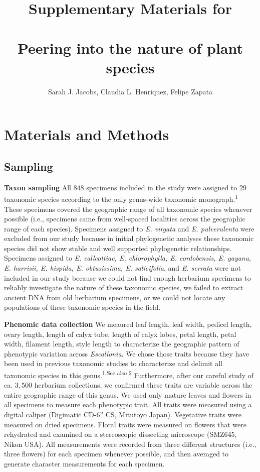 \documentclass[
  11pt,
]{article}
\title{Supplementary Materials for\\
~\\
\textbf{Peering into the nature of plant species}}
\author{Sarah J. Jacobs, Claudia L. Henriquez, Felipe Zapata}
\date{}
\begin{document}
\maketitle

{
\hypersetup{linkcolor=}
\setcounter{tocdepth}{4}
\tableofcontents
}
\hypertarget{materials-and-methods}{%
\section{Materials and Methods}\label{materials-and-methods}}

\hypertarget{sampling}{%
\subsection{Sampling}\label{sampling}}

\textbf{Taxon sampling} All \(848\) specimens included in the study were assigned to \(29\) taxonomic species according to the only genus-wide taxonomic monograph.\textsuperscript{1} These specimens covered the geographic range of all taxonomic species whenever possible (i.e., specimens came from well-spaced localities across the geographic range of each species). Specimens assigned to \emph{E. virgata} and \emph{E. pulverulenta} were excluded from our study because in initial phylogenetic analyses these taxonomic species did not show stable and well supported phylogenetic relationships. Specimens assigned to \emph{E. callcottiae, E. chlorophylla, E. cordobensis, E. gayana, E. harrisii, E. hispida, E. obtusissima, E. salicifolia}, and \emph{E. serrata} were not included in our study because we could not find enough herbarium specimens to reliably investigate the nature of these taxonomic species, we failed to extract ancient DNA from old herbarium specimens, or we could not locate any populations of these taxonomic species in the field.

\textbf{Phenomic data collection} We meaured leaf length, leaf width, pedicel length, ovary length, length of calyx tube, length of calyx lobes, petal length, petal width, filament length, style length to characterize the geographic pattern of phenotypic variation across \emph{Escallonia}. We chose those traits because they have been used in previous taxonomic studies to characterize and delimit all taxonomic species in this genus.\textsuperscript{1,See also 2} Furthermore, after our careful study of ca. \(3,500\) herbarium collections, we confirmed these traits are variable across the entire geographic range of this genus. We used only mature leaves and flowers in all specimens to measure each phenotypic trait. All traits were measured using a digital caliper (Digimatic CD-6'' CS, Mitutoyo Japan). Vegetative traits were measured on dried specimens. Floral traits were measured on flowers that were rehydrated and examined on a stereoscopic dissecting microscope (SMZ645, Nikon USA). All measurements were recorded from three different structures (i.e., three flowers) for each specimen whenever possible, and then averaged to generate character measurements for each specimen.
\end{document}
